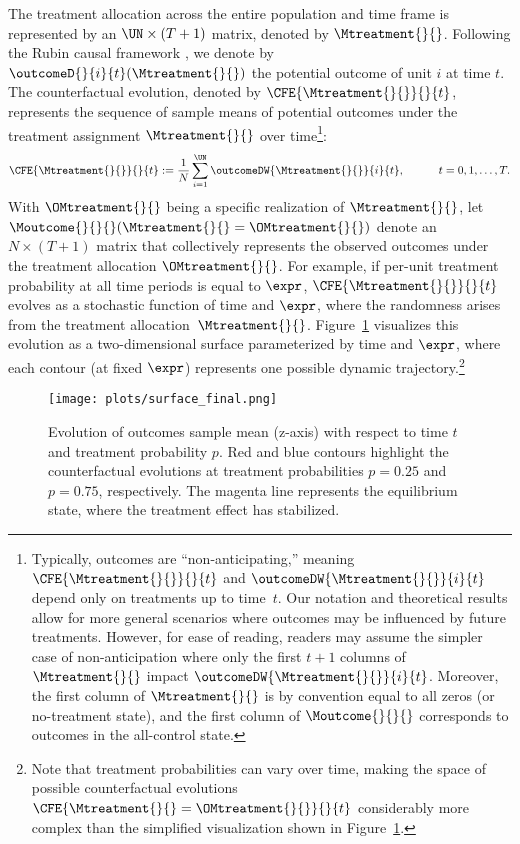 The treatment allocation across the entire population and time frame is represented by an $\UN \times (T+1)$ matrix, denoted by $\Mtreatment{}{}$. Following the Rubin causal framework \citep{imbens2015causal}, we denote by $\outcomeD{}{i}{t}(\Mtreatment{}{})$ the potential outcome of unit $i$ at time $t$. The counterfactual evolution, denoted by $\CFE{\Mtreatment{}{}}{}{t}$, represents the sequence of sample means of potential outcomes under the treatment assignment $\Mtreatment{}{}$ over time\footnote{Typically, outcomes are ``non-anticipating,'' meaning $\CFE{\Mtreatment{}{}}{}{t}$ and $\outcomeDW{\Mtreatment{}{}}{i}{t}$ depend only on treatments up to time~$t$. Our notation and theoretical results allow for more general scenarios where outcomes may be influenced by future treatments. However, for ease of reading, readers may assume the simpler case of non-anticipation where only the first $t+1$ columns of $\Mtreatment{}{}$ impact $\outcomeDW{\Mtreatment{}{}}{i}{t}$. Moreover, the first column of $\Mtreatment{}{}$ is by convention equal to all zeros (or no-treatment state), and the first column of $\Moutcome{}{}{}$ corresponds to outcomes in the all-control state.}:
% 
\begin{align}
    \label{eq:sample_mean_outcomes}
    \CFE{\Mtreatment{}{}}{}{t} :=
    \frac{1}{N} \sum_{i=1}^\UN \outcomeDW{\Mtreatment{}{}}{i}{t},
    \quad\quad\quad
    t = 0,1, \ldots, T.
\end{align}
%
With $\OMtreatment{}{}$ being a specific realization of $\Mtreatment{}{}$, let $\Moutcome{}{}{}(\Mtreatment{}{} = \OMtreatment{}{})$ denote an $N \times (T+1)$ matrix that collectively represents the observed outcomes under the treatment allocation $\OMtreatment{}{}$.  For example, if per-unit treatment probability at all time periods is equal to $\expr$, $\CFE{\Mtreatment{}{}}{}{t}$ evolves as a stochastic function of time and $\expr$, where the randomness arises from the treatment allocation~$\Mtreatment{}{}$. 
Figure~\ref{fig:SE_surface} visualizes this evolution as a two-dimensional surface parameterized by time and $\expr$, where each contour (at fixed $\expr$) represents one possible dynamic trajectory.\footnote{Note that treatment probabilities can vary over time, making the space of possible counterfactual evolutions $\CFE{\Mtreatment{}{} = \OMtreatment{}{}}{}{t}$ considerably more complex than the simplified visualization shown in Figure~\ref{fig:SE_surface}.}
% 
\begin{figure}
    \centering
    \texttt{[image: plots/surface\_final.png]}
    \caption{Evolution of outcomes sample mean (z-axis) with respect to time $t$ and treatment probability $p$. Red and blue contours highlight the counterfactual evolutions at treatment probabilities $p=0.25$ and $p=0.75$, respectively. The magenta line represents the equilibrium state, where the treatment effect has stabilized.}
    \label{fig:SE_surface}
\end{figure}
% 

